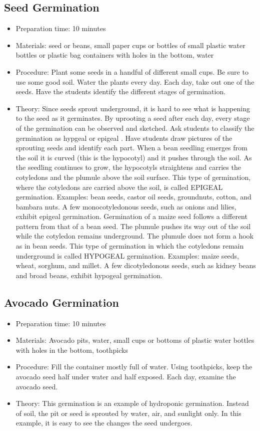 \subsection{Seed Germination}
\begin{itemize}
\item{Preparation time: 10 minutes}
\item{Materials: seed or beans, small paper cups or bottles of small plastic water bottles or plastic bag containers with holes in the bottom, water}
\item{Procedure: Plant some seeds in a handful of different small cups. Be sure to use some good soil. Water the plants every day. Each day, take out one of the seeds. Have the students identify the different stages of germination.}
\item{Theory: Since seeds sprout underground, it is hard to see what is happening to the seed as it germinates. By uprooting a seed after each day, every stage of the germination can be observed and sketched. Ask students to classify the germination as hypgeal or epigeal . Have students draw pictures of the sprouting seeds and identify each part. When a bean seedling emerges from the soil it is curved (this is the hypocotyl) and it pushes through the soil. As the seedling continues to grow, the hypocotyls straightens and carries the cotyledons and the plumule above the soil surface. This type of germination, where the cotyledons are carried above the soil, is called EPIGEAL germination. Examples: bean seeds, castor oil seeds, groundnuts, cotton, and bambara nuts. A few monocotyledonous seeds, such as onions and lilies, exhibit epigeal germination. Germination of a maize seed follows a different pattern from that of a bean seed. The plumule pushes its way out of the soil while the cotyledon remains underground. The plumule does not form a hook as in bean seeds. This type of germination in which the cotyledons remain underground is called HYPOGEAL germination. Examples: maize seeds, wheat, sorghum, and millet. A few dicotyledonous seeds, such as kidney beans and broad beans, exhibit hypogeal germination.}
\end{itemize}

\subsection{Avocado Germination}
\begin{itemize}
\item{Preparation time: 10 minutes}
\item{Materials: Avocado pits, water, small cups or bottoms of plastic water bottles with holes in the bottom, toothpicks}
\item{Procedure: Fill the container mostly full of water. Using toothpicks, keep the avocado seed half under water and half exposed. Each day, examine the avocado seed.}
\item{Theory: This germination is an example of hydroponic germination. Instead of soil, the pit or seed is sprouted by water, air, and sunlight only. In this example, it is easy to see the changes the seed undergoes.}
\end{itemize}


